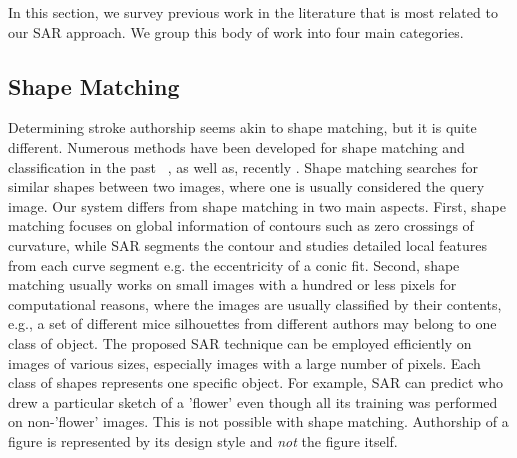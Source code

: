 In this section, we survey previous work in the literature that is most related to our SAR approach. We group this body of work into four main categories.

\vspace{-2mm}
\subsection{Shape Matching} \label{subsec: shapematching}
\vspace{-2mm}
Determining stroke authorship seems akin to shape matching, but it is quite different. Numerous methods have been developed for shape matching and classification in the past ~\cite{Wolfson90:0,mokhtarian1992theory,conf/cvpr/CohenH98,Latecki:2000:SSM:354167.354193,belongie2001matching,jin2003image,berg2005shape,Mori2005}, as well as, recently \cite{Michel:2011:SID:1994006.1994152,ion-cviu-11}. Shape matching searches for similar shapes between two images, where one is usually considered the query image. Our system differs from shape matching in two main aspects. First, shape matching focuses on global information of contours such as zero crossings of curvature, while SAR segments the contour and studies detailed local features from each curve segment e.g. the eccentricity of a conic fit. Second, shape matching usually works on small images with a hundred or less pixels for computational reasons, where the images are usually classified by their contents, e.g., a set of different mice silhouettes from different authors may belong to one class of object. The proposed SAR technique can be employed efficiently on images of various sizes, especially images with a large number of pixels. Each class of shapes represents one specific object. For example, SAR can predict who drew a particular sketch of a 'flower' even though all its training was performed on non-'flower' images. This is not possible with shape matching. Authorship of a figure is represented by its design style and \emph{not} the figure itself. 

\vspace{-2mm}
